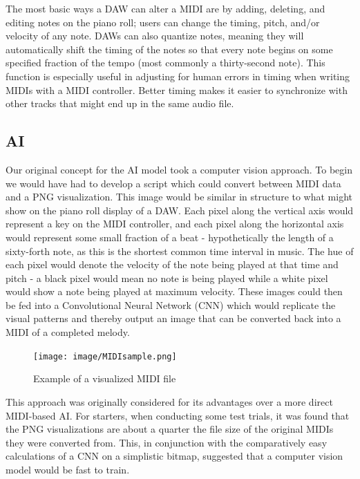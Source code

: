 The most basic ways a DAW can alter a MIDI are by adding, deleting, and editing notes on
the piano roll; users can change the timing, pitch, and/or velocity of any note. DAWs can
also quantize notes, meaning they will automatically shift the timing of the notes so that
every note begins on some specified fraction of the tempo (most commonly a thirty-second
note). This function is especially useful in adjusting for human errors in timing when
writing MIDIs with a MIDI controller. Better timing makes it easier to synchronize with
other tracks that might end up in the same audio file.


\subsection{AI}

Our original concept for the AI model took a computer vision approach. To begin we would
have had to develop a script which could convert between MIDI data and a PNG
visualization. This image would be similar in structure to what might show on the piano
roll display of a DAW. Each pixel along the vertical axis would represent a key on the
MIDI controller, and each pixel along the horizontal axis would represent some small
fraction of a beat - hypothetically the length of a sixty-forth note, as this is the
shortest common time interval in music. The hue of each pixel would denote the velocity
of the note being played at that time and pitch - a black pixel would mean no note is
being played while a white pixel would show a note being played at maximum velocity.
These images could then be fed into a Convolutional Neural Network (CNN) which would
replicate the visual patterns and thereby output an image that can be converted back into
a MIDI of a completed melody.

\begin{figure}[h!]
  \centering
  \texttt{[image: image/MIDIsample.png]}
  \caption{Example of a visualized MIDI file}
  \label{fig:midi_sample}
\end{figure}

This approach was originally considered for its advantages over a more direct MIDI-based
AI. For starters, when conducting some test trials, it was found that the PNG
visualizations are about a quarter the file size of the original MIDIs they were converted
from. This, in conjunction with the comparatively easy calculations of a CNN on a
simplistic bitmap, suggested that a computer vision model would be fast to train.

